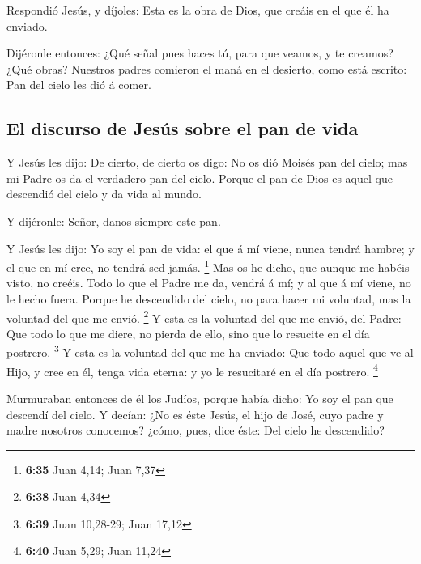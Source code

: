  Respondió Jesús, y díjoles: Esta es la obra de Dios, que
creáis en el que él ha enviado.

 Dijéronle entonces: ¿Qué señal pues haces tú, para que
veamos, y te creamos? ¿Qué obras?  Nuestros padres comieron
el maná en el desierto, como está escrito: Pan del cielo les dió á
comer.

\hypertarget{el-discurso-de-jesuxfas-sobre-el-pan-de-vida}{%
\subsection{El discurso de Jesús sobre el pan de
vida}\label{el-discurso-de-jesuxfas-sobre-el-pan-de-vida}}

 Y Jesús les dijo: De cierto, de cierto os digo: No os dió
Moisés pan del cielo; mas mi Padre os da el verdadero pan del cielo.
 Porque el pan de Dios es aquel que descendió del cielo y
da vida al mundo.

 Y dijéronle: Señor, danos siempre este pan.

 Y Jesús les dijo: Yo soy el pan de vida: el que á mí
viene, nunca tendrá hambre; y el que en mí cree, no tendrá sed jamás.
\footnote{\textbf{6:35} Juan 4,14; Juan 7,37}  Mas os he
dicho, que aunque me habéis visto, no creéis.  Todo lo que
el Padre me da, vendrá á mí; y al que á mí viene, no le hecho fuera.
 Porque he descendido del cielo, no para hacer mi voluntad,
mas la voluntad del que me envió. \footnote{\textbf{6:38} Juan 4,34}
 Y esta es la voluntad del que me envió, del Padre: Que
todo lo que me diere, no pierda de ello, sino que lo resucite en el día
postrero. \footnote{\textbf{6:39} Juan 10,28-29; Juan 17,12}
 Y esta es la voluntad del que me ha enviado: Que todo
aquel que ve al Hijo, y cree en él, tenga vida eterna: y yo le
resucitaré en el día postrero. \footnote{\textbf{6:40} Juan 5,29; Juan
  11,24}

 Murmuraban entonces de él los Judíos, porque había dicho:
Yo soy el pan que descendí del cielo.  Y decían: ¿No es
éste Jesús, el hijo de José, cuyo padre y madre nosotros conocemos?
¿cómo, pues, dice éste: Del cielo he descendido?

